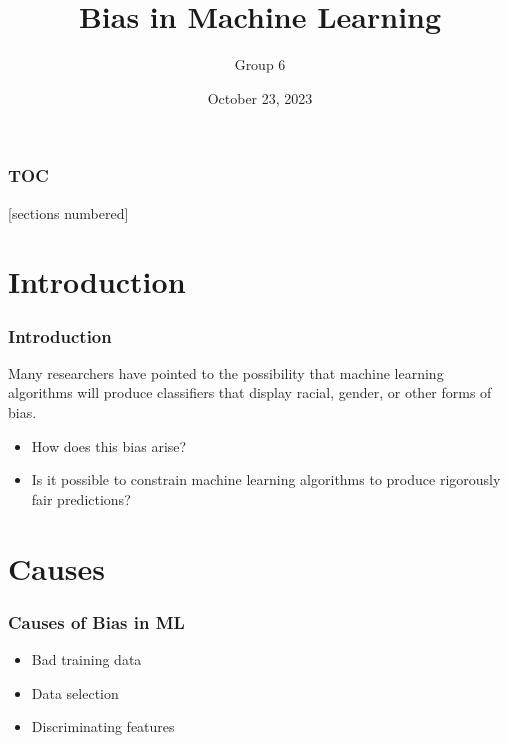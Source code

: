 \documentclass{beamer}
\title{Bias in Machine Learning}
\subtitle{}
\author{Group 6}
\date{October 23, 2023}
\institute{\url{www.units.it}}
\numberwithin{figure}{section}
\numberwithin{equation}{section}
\begin{document}

\begin{frame}[plain,t]
\titlepage
\end{frame}


\begin{frame}
  \addtocounter{framenumber}{-1}
  \scriptsize
  \frametitle{TOC}
  [sections numbered]
  \tableofcontents[hideallsubsections]
\end{frame}


\section{Introduction}
\begin{frame}
 \frametitle{Introduction}
 Many researchers have pointed to the possibility that machine learning algorithms will produce classifiers that display racial, gender, or other forms of bias.
 \begin{itemize}
  \item How does this bias arise?
  \item Is it possible to constrain machine learning algorithms to produce rigorously fair predictions? 
\end{itemize}
\end{frame}


\section{Causes}
\begin{frame}
 \frametitle{Causes of Bias in ML}
 \begin{itemize}
    \item Bad training data
    \item Data selection 
    \item Discriminating features
\end{itemize}
\end{frame}
\end{document}
